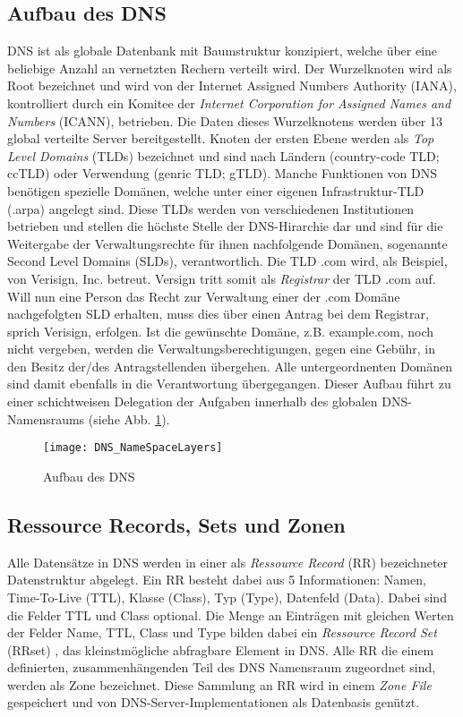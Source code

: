 \subsection{Aufbau des DNS}

DNS ist als globale Datenbank mit Baumstruktur konzipiert, welche über eine beliebige Anzahl an vernetzten Rechern verteilt wird. Der Wurzelknoten wird als Root bezeichnet und wird von der Internet Assigned Numbers Authority (IANA), kontrolliert durch ein Komitee der \textit{Internet Corporation for Assigned Names and Numbers} (ICANN), betrieben. Die Daten dieses Wurzelknotens werden über 13 global verteilte Server bereitgestellt. Knoten der ersten Ebene werden als \textit{Top Level Domains} (TLDs) bezeichnet und sind nach Ländern (country-code TLD; ccTLD) oder Verwendung (genric TLD; gTLD). Manche Funktionen von DNS benötigen spezielle Domänen, welche unter einer eigenen Infrastruktur-TLD (.arpa) angelegt sind. Diese TLDs werden von verschiedenen Institutionen betrieben und stellen die höchste Stelle der DNS-Hirarchie dar und sind für die Weitergabe der Verwaltungsrechte für ihnen nachfolgende Domänen, sogenannte Second Level Domains (SLDs), verantwortlich. Die TLD .com wird, als Beispiel, von Verisign, Inc. betreut. Versign tritt somit als \textit{Registrar} der TLD .com auf. Will nun eine Person das Recht zur Verwaltung einer der .com Domäne nachgefolgten SLD erhalten, muss dies über einen Antrag bei dem Registrar, sprich Verisign, erfolgen. Ist die gewünschte Domäne, z.B. example.com, noch nicht vergeben, werden die Verwaltungsberechtigungen, gegen eine Gebühr, in den Besitz der/des Antragstellenden übergehen. Alle untergeordnenten Domänen sind damit ebenfalls in die Verantwortung übergegangen. Dieser Aufbau führt zu einer schichtweisen Delegation der Aufgaben innerhalb des globalen DNS-Namensraums (siehe Abb. \ref{img:dnsnamespace}). 

\begin{figure}[htbp]
    \centering
    \texttt{[image: DNS\_NameSpaceLayers]}
    \caption{Aufbau des DNS}
    \label{img:dnsnamespace}
\end{figure}

\subsection{Ressource Records, Sets und Zonen}

Alle Datensätze in DNS werden in einer als \textit{Ressource Record} (RR) bezeichneter Datenstruktur abgelegt. Ein RR besteht dabei aus 5 Informationen: Namen, Time-To-Live (TTL), Klasse (Class), Typ (Type), Datenfeld (Data). Dabei sind die Felder TTL und Class optional. Die Menge an Einträgen mit gleichen Werten der Felder Name, TTL, Class und Type bilden dabei ein \textit{Ressource Record Set} (RRset) \cite{rfc2181}, das kleinstmögliche abfragbare Element in DNS. Alle RR die einem definierten, zusammenhängenden Teil des DNS Namensraum zugeordnet sind, werden als Zone bezeichnet. Diese Sammlung an RR wird in einem \textit{Zone File} gespeichert und von DNS-Server-Implementationen als Datenbasis genützt.   

